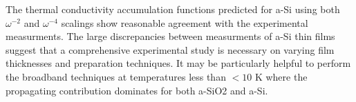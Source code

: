 \documentclass[aps,prb,onecolumn,preprint,superscriptaddress,footinbib,amsmath,amssymb,floatfix]{revtex4}
\begin{document}
The thermal conductivity accumulation functions predicted for a-Si 
using both $\omega^{-2}$ 
and $\omega^{-4}$ scalings show reasonable agreement 
with the experimental measurments.
\cite{feldman_thermal_1993,cahill_thermal_1994,
feldman_numerical_1999,liu_high_2009,yang_anomalously_2010,
regner_broadband_2013} 
The large discrepancies between measurments of 
a-Si thin films suggest that a comprehensive 
experimental study is necessary on varying film thicknesses 
and preparation techniques.  
It may be particularly helpful to perform the broadband techniques
\cite{koh_frequency_2007,minnich_thermal_2011,regner_broadband_2013} 
at temperatures less than $< 10$ K where the propagating contribution 
dominates for both a-SiO2 and a-Si.
\cite{freeman_thermal_1986,cahill_lattice_1988,cahill_thermal_1989,
love_estimate_1990,feldman_thermal_1993,cahill_thermal_1994,
feldman_numerical_1999,baldi_thermal_2008,liu_high_2009,
yang_anomalously_2010} 

\clearpage


\end{document}
